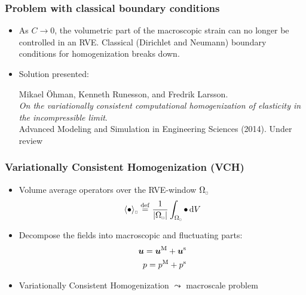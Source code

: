 \documentclass[11pt]{beamer} %
\DeclarePairedDelimiter{\homgen}{\langle}{\rangle_\rve}
\DeclarePairedDelimiter{\shomgen}{\langle\!\langle}{\rangle\!\rangle_\rve}
\newcommand{\volume}{|\Omega_\rve|}
\newcommand{\pore}{\mathrm{pore}}
\newcommand{\particle}{\mathrm{part}}
\newcommand{\rve}{
  {\mathchoice
   {\mbox{\scalebox{0.67}{$\Box$}}}
   {\mbox{\scalebox{0.67}{$\Box$}}}
   {\mbox{\scalebox{0.5}{$\Box$}}}
   {\mbox{\scalebox{0.375}{$\Box$}}}
  }
}
\begin{document}
\begin{frame}
 \frametitle{Problem with classical boundary conditions}
  \begin{itemize}
   \item As $C\to 0$, the volumetric part of the macroscopic strain can no longer be controlled in an RVE. Classical (Dirichlet and Neumann) boundary conditions for homogenization breaks down.
   \item Solution presented:
    \begin{center}
     Mikael Öhman, Kenneth Runesson, and Fredrik Larsson.
     \\%
    \textit{On the variationally consistent computational homogenization of elasticity in the incompressible limit}.
     \\%
     Advanced Modeling and Simulation in Engineering Sciences (2014). Under review
    \end{center}
  \end{itemize}
\end{frame}

\begin{frame}
 \frametitle{Variationally Consistent Homogenization (VCH)}
\begin{itemize}
 \item Volume average operators over the RVE-window $\Omega_\rve$
\begin{align*}
 \homgen{\bullet} \defeq \frac{1}{\volume} \int_{\Omega_\rve} \bullet \dif V%
\end{align*}
 \item Decompose the fields into macroscopic and fluctuating parts:
 \begin{align*}
  \boldsymbol{u} = \boldsymbol{u}^{\mathrm{M}} + \boldsymbol{u}^{\mathrm{s}}
   \\
  p = p^{\mathrm{M}} + p^{\mathrm{s}}
 \end{align*}
 \item Variationally Consistent Homogenization $\leadsto$ macroscale problem
\end{itemize}
\end{frame}
\end{document}
